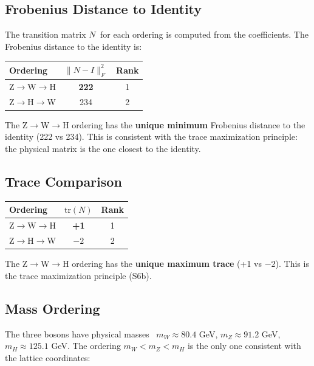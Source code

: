 \subsection{Frobenius Distance to Identity}\label{app:boson_frobenius}

The transition matrix $N$ for each ordering is computed from the coefficients. The Frobenius distance to the identity is:

\begin{center}
\label{tab:boson_frobenius}
\begin{tabular}{lcc}
\hline\hline
Ordering & $\|N - I\|_F^2$ & Rank \\
\hline
Z$\to$W$\to$H & \textbf{222} & 1 \\
Z$\to$H$\to$W & 234 & 2 \\
\hline\hline
\end{tabular}
\end{center}

The Z$\to$W$\to$H ordering has the \textbf{unique minimum} Frobenius distance to the identity (222 vs 234). This is consistent with the trace maximization principle: the physical matrix is the one closest to the identity.

\subsection{Trace Comparison}\label{app:boson_trace}

\begin{center}
\label{tab:boson_trace}
\begin{tabular}{lcc}
\hline\hline
Ordering & $\mathrm{tr}(N)$ & Rank \\
\hline
Z$\to$W$\to$H & \textbf{+1} & 1 \\
Z$\to$H$\to$W & $-2$ & 2 \\
\hline\hline
\end{tabular}
\end{center}

The Z$\to$W$\to$H ordering has the \textbf{unique maximum trace} (+1 vs $-2$). This is the trace maximization principle (S6b).

\subsection{Mass Ordering}\label{app:boson_mass}

The three bosons have physical masses~\cite{pdg2024} $m_W \approx 80.4$ GeV, $m_Z \approx 91.2$ GeV, $m_H \approx 125.1$ GeV. The ordering $m_W < m_Z < m_H$ is the only one consistent with the lattice coordinates:

